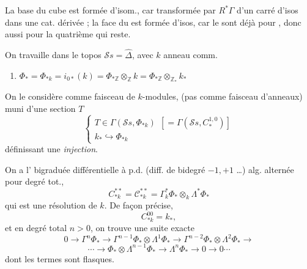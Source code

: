 \documentclass[11pt,a4paper]{article}
\begin{document}
La base du cube est formée d'isom., car transformée par $R^*\Gamma$ d'un carré d'isos
dans une cat. dérivée ; la face \struck{\ill{}} du  est formée d'isos, car
\ill{} le sont déjà pour , donc aussi pour la quatrième qui reste.

On travaille dans le topos $\mathcal{S}s = \widehat{\Delta}$, avec $k$ anneau comm.
\begin{enumerate}
  \item[] $\Phi_* = \Phi_{*k} = i_{0*}(k) = \Phi_{*\mathbb{Z}} \otimes_{\mathbb{Z}} k
  = \Phi_{*\mathbb{Z}} \otimes_{\mathbb{Z}_*} k_*$
\end{enumerate}
 On le considère comme faisceau de $k$-modules, (pas comme faisceau
d'anneaux) muni d'une section $T$
\[
  \left\{\begin{array}{l}
    T \in \Gamma(\mathcal{S}s, \Phi_{*k}) \ \ [= \Gamma(\mathcal{S}s, C^{1,0}_*)] \\
    k_* \hookrightarrow \Phi_{*k}
  \end{array}\right.
\]
définissant une \emph{injection}.

On a l' bigraduée \struck{\ill{}} différentielle à p.d. (diff. de bidegré
$-1, +1$ \ldots)  alg. alternée pour degré tot.,
\[
  C^{**}_{*k} = \mathcal{C}^{**}_{*k} = \Gamma^*_k \Phi_* \otimes_k \Lambda^* \Phi_*
\]
qui est une résolution de $k$. De façon précise,
\[
  C^{00}_{*k} = k_*,
\]
et en degré total $n > 0$, on trouve une suite exacte
\[
  0 \to \Gamma^n \Phi_* \to \Gamma^{n-1} \Phi_* \otimes \Lambda^1 \Phi_* \to
  \Gamma^{n-2} \Phi_* \otimes \Lambda^2 \Phi_* \to
\]
\[
  \cdots \to \Phi_* \otimes \Lambda^{n-1} \Phi_* \to \Lambda^n \Phi_* \to 0 \to 0 \cdots
\]
dont les termes  sont flasques.
\end{document}
